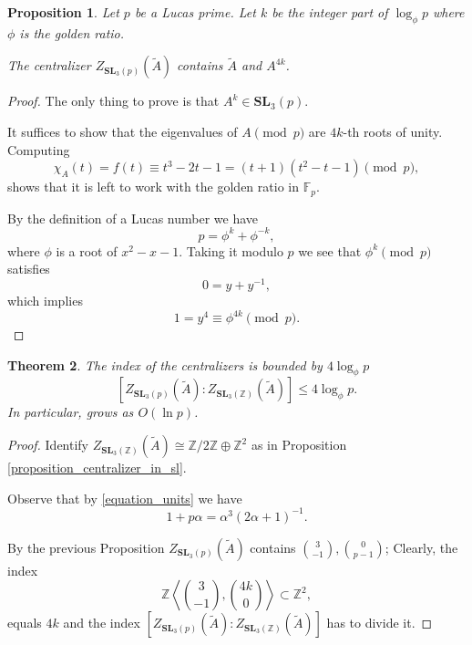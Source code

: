\documentclass[a4paper]{article}
\newtheorem{Thm}{Theorem}[section]
\newtheorem{Prop}[Thm]{Proposition}
\newcommand{\SL}{\mathbf{SL}_3(\mathbb{Z})}        %
\newcommand{\SLp}{\mathbf{SL}_3(p)}        %
\begin{document}
\begin{Prop}
Let $p$ be a Lucas prime.
Let $k$ be the integer part of $\log_{\phi} p$ where $\phi$ is the golden ratio.

The centralizer $Z_{\SLp}(\tilde A)$ contains $\tilde A$ and $A^{4k}$.
\end{Prop}
\begin{proof}
The only thing to prove is that 
$A^k \in \SLp$.

It suffices to show that the eigenvalues of $A \pmod p$ are $4k$-th roots of unity.
Computing
\[
\chi_{A}(t) = f(t) \equiv t^3 - 2 t - 1 = (t + 1) (t^2 - t - 1) \pmod p
,\] 
shows that it is left to work with the golden ratio in $\mathbb F_p$.

By the definition of a Lucas number we have 
\[
p = \phi^k + \phi^{-k} 
,\] 
where $\phi$ is a root of $x^2 - x - 1$.
Taking it modulo $p$ we see that $\phi^k \pmod p$ satisfies 
\[
0 = y + y^{-1} 
,\] 
which implies 
\[
1 = y^4 \equiv \phi^{4k} \pmod p
.\] 
\end{proof}

\begin{Thm}
	The index of the centralizers is bounded by $4 \log_{\phi} p$
\[
	[Z_{\SLp}(\tilde A) : Z_{\SL}(\tilde A)] \le 4 \log_{\phi} p
.\] 
In particular, grows as $O(\ln p)$.
\end{Thm}
\begin{proof}
Identify $Z_{\SL}(\tilde A) \cong \mathbb{Z}/2\mathbb{Z} \oplus \mathbb{Z}^2$ as in Proposition \ref{proposition_centralizer_in_sl}.

Observe that by \eqref{equation_units} we have
\[
1 + p \alpha = \alpha^3 (2 \alpha + 1)^{-1} 
.\] 

By the previous Proposition 
$Z_{\SLp}(\tilde A)$ contains $\binom{3}{-1}, \binom{0}{p-1}$;
Clearly, the index
\[
\mathbb{Z} \left< \binom{3}{-1}, \binom{4k}{0}\right> \subset \mathbb{Z}^2
,\] 
equals $4k$ and the index 
$ [Z_{\SLp}(\tilde A) : Z_{\SL}(\tilde A)]$
has to divide it.
\end{proof}




\end{document}
